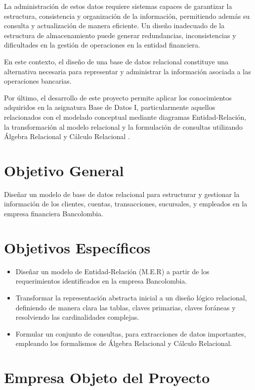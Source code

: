 \documentclass[stu,12pt,floatsintext]{apa7}
\begin{document}
La administración de estos datos requiere sistemas capaces de garantizar la estructura, consistencia y organización de la información, permitiendo además su consulta y actualización de manera eficiente. Un diseño inadecuado de la estructura de almacenamiento puede generar redundancias, inconsistencias y dificultades en la gestión de operaciones en la entidad financiera.

En este contexto, el diseño de una base de datos relacional constituye una alternativa necesaria para representar y administrar la información asociada a las operaciones bancarias. 

Por último, el desarrollo de este proyecto permite aplicar los conocimientos adquiridos en la asignatura Base de Datos I, particularmente aquellos relacionados con el modelado conceptual mediante diagramas Entidad-Relación, la transformación al modelo relacional y la formulación de consultas utilizando Álgebra Relacional y Cálculo Relacional \parencite{Silberschatz2020}.


\section{Objetivo General}

Diseñar un modelo de base de datos relacional para estructurar y gestionar la información de los clientes, cuentas, transacciones, sucursales, y empleados en la empresa financiera Bancolombia.

\section{Objetivos Específicos}

\begin{itemize}
    \item Diseñar un modelo de Entidad-Relación (M.E.R) a partir de los requerimientos identificados en la empresa Bancolombia.
    \item Transformar la representación abstracta inicial a un diseño lógico relacional, definiendo de manera clara las tablas, claves primarias, claves foráneas y resolviendo las cardinalidades complejas.
    \item Formular un conjunto de consultas, para extracciones de datos importantes, empleando los formalismos de Álgebra Relacional y Cálculo Relacional.

\end{itemize}

\section{Empresa Objeto del Proyecto}
\end{document}
